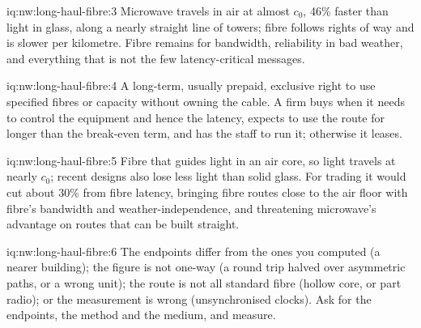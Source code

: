 \begin{solution}{iq:nw:long-haul-fibre:3}
Microwave travels in air at almost $c_0$, 46\% faster than light in glass, along a nearly straight line of towers; fibre follows rights of way
and is slower per kilometre. Fibre remains for bandwidth, reliability in bad weather, and everything that is not the few latency-critical
messages.
\end{solution}

\begin{solution}{iq:nw:long-haul-fibre:4}
A long-term, usually prepaid, exclusive right to use specified fibres or capacity without owning the cable. A firm buys  when it needs
to control the equipment and hence the latency, expects to use the route for longer than the break-even term, and has the staff to run it;
otherwise it leases.
\end{solution}

\begin{solution}{iq:nw:long-haul-fibre:5}
Fibre that guides light in an air core, so light travels at nearly $c_0$; recent designs also lose less light than solid glass. For trading it
would cut about 30\% from fibre latency, bringing fibre routes close to the air floor with fibre's bandwidth and weather-independence, and
threatening microwave's advantage on routes that can be built straight.
\end{solution}

\begin{solution}{iq:nw:long-haul-fibre:6}
The endpoints differ from the ones you computed (a nearer building); the figure is not one-way (a round trip halved over asymmetric paths, or
a wrong unit); the route is not all standard fibre (hollow core, or part radio); or the measurement is wrong (unsynchronised clocks). Ask
for the endpoints, the method and the medium, and measure.
\end{solution}

